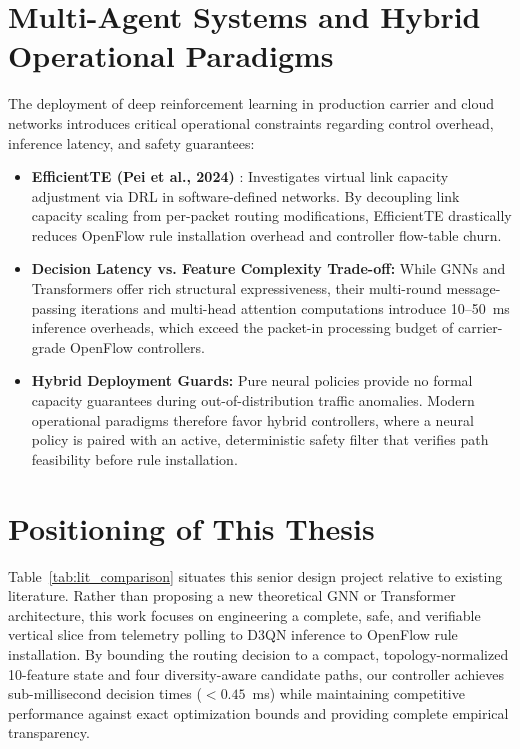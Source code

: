 \documentclass[12pt,a4paper,oneside]{report}
\begin{document}
\section{Multi-Agent Systems and Hybrid Operational Paradigms}
\label{sec:lit_multiagent_hybrid}
The deployment of deep reinforcement learning in production carrier and cloud networks introduces critical operational constraints regarding control overhead, inference latency, and safety guarantees:
\begin{itemize}
  \item \textbf{EfficientTE (Pei et al., 2024)} \cite{pei2024efficientte}: Investigates virtual link capacity adjustment via DRL in software-defined networks. By decoupling link capacity scaling from per-packet routing modifications, EfficientTE drastically reduces OpenFlow rule installation overhead and controller flow-table churn.
  \item \textbf{Decision Latency vs. Feature Complexity Trade-off:} While GNNs and Transformers offer rich structural expressiveness, their multi-round message-passing iterations and multi-head attention computations introduce 10--50~ms inference overheads, which exceed the packet-in processing budget of carrier-grade OpenFlow controllers.
  \item \textbf{Hybrid Deployment Guards:} Pure neural policies provide no formal capacity guarantees during out-of-distribution traffic anomalies. Modern operational paradigms therefore favor hybrid controllers, where a neural policy is paired with an active, deterministic safety filter that verifies path feasibility before rule installation.
\end{itemize}

\section{Positioning of This Thesis}
Table~\ref{tab:lit_comparison} situates this senior design project relative to existing literature. Rather than proposing a new theoretical GNN or Transformer architecture, this work focuses on engineering a complete, safe, and verifiable vertical slice from telemetry polling to D3QN inference to OpenFlow rule installation. By bounding the routing decision to a compact, topology-normalized 10-feature state and four diversity-aware candidate paths, our controller achieves sub-millisecond decision times ($<0.45$~ms) while maintaining competitive performance against exact optimization bounds and providing complete empirical transparency.
\end{document}

